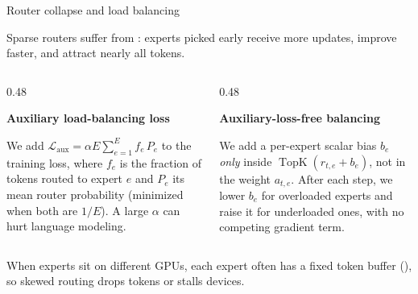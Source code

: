 \documentclass[11pt,aspectratio=169]{beamer}
\begin{document}
\begin{frame}{Router collapse and load balancing}
    \setlength{\parskip}{4pt}

    Sparse routers suffer from : experts picked early
    receive more updates, improve faster, and attract nearly all tokens.

    \begin{columns}[T,onlytextwidth]
        \begin{column}{0.48\textwidth}
            \begin{tcolorbox}[nndsblue,courseheight={moe-bal}{0.32\textheight},boxsep=1mm,top=1.5mm,bottom=1.5mm]\footnotesize
                \textbf{\color{darkcerulean}Auxiliary load-balancing loss}\par
                We add $\mathcal{L}_{\text{aux}} = \alpha E \sum_{e=1}^{E} f_e\,P_e$
                to the training loss, where $f_e$ is the fraction of tokens
                routed to expert $e$ and $P_e$ its mean router probability
                (minimized when both are $1/E$). A large $\alpha$ can hurt
                language modeling.
            \end{tcolorbox}
        \end{column}
        \begin{column}{0.48\textwidth}
            \begin{tcolorbox}[nndsgreen,courseheight={moe-bal}{0.32\textheight},boxsep=1mm,top=1.5mm,bottom=1.5mm]\footnotesize
                \textbf{\color{darkgreen}Auxiliary-loss-free balancing}\par
                We add a per-expert scalar bias $b_e$ \emph{only} inside
                $\operatorname{TopK}(r_{t,e}+b_e)$, not in the weight
                $a_{t,e}$. After each step, we lower $b_e$ for overloaded
                experts and raise it for underloaded ones, with no competing
                gradient term.
            \end{tcolorbox}
        \end{column}
    \end{columns}

    \smallskip
    When experts sit on different GPUs, each expert often has a fixed token
    buffer (), so skewed routing drops tokens or
    stalls devices.


\end{frame}
\end{document}
